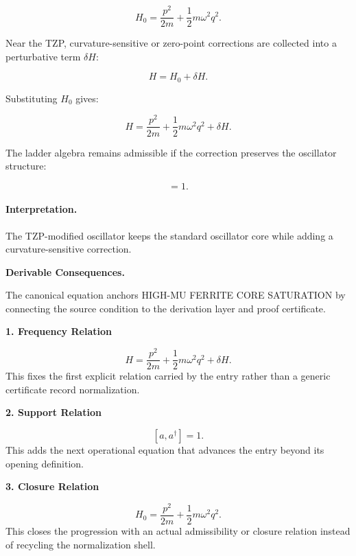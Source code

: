 \begin{equation}
H_0
=
\frac{p^2}{2m}
+
\frac{1}{2}m\omega^2 q^2 .
\end{equation}

Near the TZP, curvature-sensitive or zero-point corrections are collected into a perturbative term $\delta H$:

\begin{equation}
H = H_0+\delta H .
\end{equation}

Substituting $H_0$ gives:

\begin{equation}
\boxed{
H
=
\frac{p^2}{2m}
+
\frac{1}{2}m\omega^2 q^2
+
\delta H .
}
\end{equation}

The ladder algebra remains admissible if the correction preserves the oscillator structure:

\begin{equation}
[a,a^\dagger]=1 .
\end{equation}

\paragraph{Interpretation.}
The TZP-modified oscillator keeps the standard oscillator core while adding a curvature-sensitive correction.

\par\vspace{0.35em}
\noindent\textbf{Derivable Consequences.}\quad
\begingroup
\footnotesize
\raggedright
The canonical equation anchors HIGH-MU FERRITE CORE SATURATION by connecting the source condition to the derivation layer and proof certificate.
\par\endgroup

\noindent\textbf{1. Frequency Relation}\par
\[
H = \frac{p^2}{2m} + \frac{1}{2}m\omega^2 q^2 + \delta H.
\]
\noindent This fixes the first explicit relation carried by the entry rather than a generic certificate record normalization.\par
\noindent\textbf{2. Support Relation}\par
\[
[a,a^\dagger]=1.
\]
\noindent This adds the next operational equation that advances the entry beyond its opening definition.\par
\noindent\textbf{3. Closure Relation}\par
\[
H_0 = \frac{p^2}{2m} + \frac{1}{2}m\omega^2 q^2.
\]
\noindent This closes the progression with an actual admissibility or closure relation instead of recycling the normalization shell.\par


